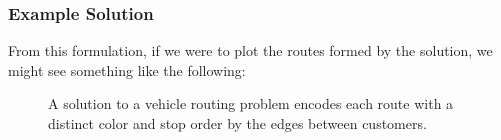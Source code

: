 \documentclass{beamer}
\begin{document}
	\begin{frame}[t]
		\frametitle{Example Solution}
		\small
		\vspace{-.25cm}
		From this formulation, if we were to plot the routes formed by the solution, we might see something like the following:
		\begin{figure}[h]
			\caption{A solution to a vehicle routing problem encodes each route with a distinct color and stop order by the edges between customers.}
			\label{p:solution}
		\end{figure}
		\normalsize
	\end{frame}
\end{document}
